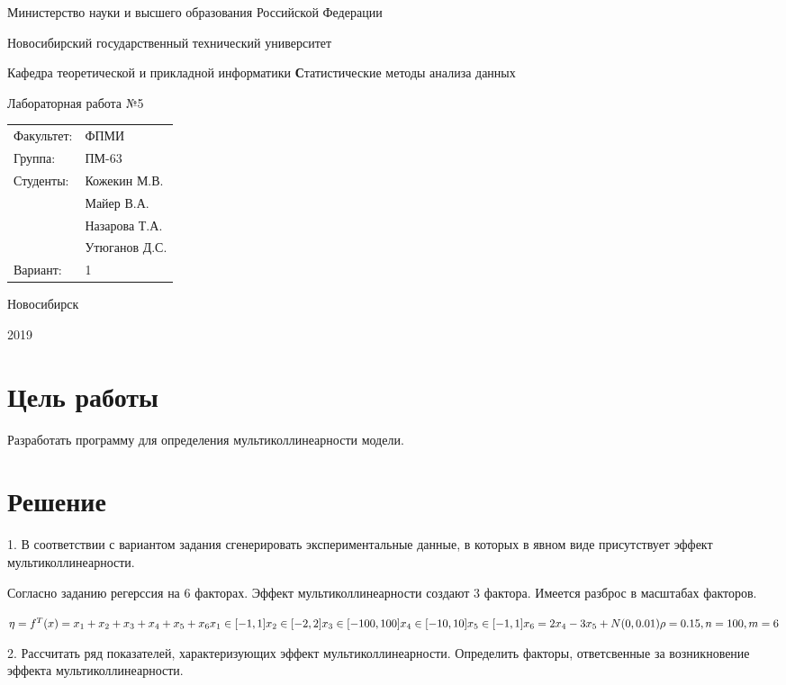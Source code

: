 ﻿\documentclass[12pt, a4paper]{article}
\newcommand{\insertTitle}[9]{
\begin{titlepage}
	\begin{center}
    	\large
		Министерство науки и высшего образования Российской Федерации
		
		Новосибирский государственный технический университет
		
		Кафедра теоретической и прикладной информатики
		\vfill
		{\textbf #1}
		
		Лабораторная работа №#2
		\vfill
	\end{center}
	
	\begin{tabular}{ m{7em}  m{7em} }
	Факультет: & ФПМИ \\ 
	Группа: & #3 \\  
	Студенты: & #4 \\
			   & #5 \\
			   & #6 \\
			   & #7 \\	
	Вариант: & #8
	\end{tabular}
	\vfill

\begin{center}
Новосибирск

#9
\end{center}
\end{titlepage}
}
\begin{document}
\setlength{\abovedisplayskip}{1pt}
\setlength{\belowdisplayskip}{1pt}



\insertTitle{Статистические методы анализа данных}{5}{ПМ-63}{Кожекин М.В.}{Майер В.А.}{Назарова Т.А.}{Утюганов Д.С.}{1}{2019}




\section{Цель работы}
Разработать программу для определения мультиколлинеарности модели.




\section{Решение}

1.	В соответствии с вариантом задания сгенерировать экспериментальные данные, в которых в явном виде присутствует эффект мультиколлинеарности.

Согласно заданию регерссия на 6 факторах. Эффект мультиколлинеарности создают 3 фактора. Имеется разброс в масштабах факторов.

\(
\eta = f^T(x) =  x_1 + x_2 + x_3 + x_4 + x_5 + x_6 \\
x_1 \in [-1, 1] \\
x_2 \in [-2, 2] \\
x_3 \in [-100, 100] \\
x_4 \in [-10, 10] \\
x_5 \in [-1, 1] \\
x_6  = 2 x_4 - 3 x_5 + N(0, 0.01)\\
\rho = 0.15, n = 100, m = 6
\)



2. Рассчитать ряд показателей, характеризующих эффект мультиколлинеарности. Определить факторы, ответсвенные за возникновение  эффекта мультиколлинеарности.
\end{document}
